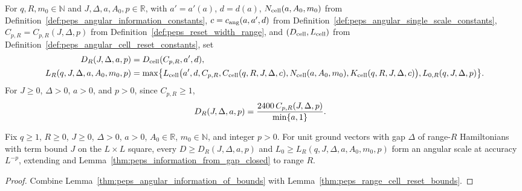\begin{definition}
    \label{def:peps_angular_constants_range}
    \leanok
    For $q,R,m_0\in\mathbb N$ and $J,\Delta,a,A_0,p\in\mathbb R$, with $a'=a'(a)$, $d=d(a)$, $N_{\rm cell}(a,A_0,m_0)$ from Definition~\ref{def:peps_angular_information_constants}, $c=c_{\rm ang}(a,a',d)$ from Definition~\ref{def:peps_angular_single_scale_constants}, $C_{p,R}=C_{p,R}(J,\Delta,p)$ from Definition~\ref{def:peps_reset_width_range}, and $(D_{\rm cell},L_{\rm cell})$ from Definition~\ref{def:peps_angular_cell_reset_constants}, set
    \begin{align}
        D_R(J,\Delta,a,p)           & =D_{\rm cell}(C_{p,R},a',d), \notag         \\
        L_R(q,J,\Delta,a,A_0,m_0,p) & =\max\bigl\{L_{\rm cell}\bigl(a',d,C_{p,R},
        C_{\rm cell}(q,R,J,\Delta,c),N_{\rm cell}(a,A_0,m_0),
        K_{\rm cell}(q,R,J,\Delta,c)\bigr),L_{0,R}(q,J,\Delta,p)\bigr\}.
        \label{eq:peps_angular_constants_range}
    \end{align}
    For $J\ge0$, $\Delta>0$, $a>0$, and $p>0$, since $C_{p,R}\ge1$,
    \begin{align}
        D_R(J,\Delta,a,p) & =\frac{2400\,C_{p,R}(J,\Delta,p)}{\min\{a,1\}}.
        \notag
    \end{align}
\end{definition}

\begin{lemma}
    \label{thm:peps_angular_information_range_closed}
    \leanok
    Fix $q\ge1$, $R\ge0$, $J\ge0$, $\Delta>0$, $a>0$, $A_0\in\mathbb R$, $m_0\in\mathbb N$, and integer $p>0$. For unit ground vectors with gap $\Delta$ of range-$R$ Hamiltonians with term bound $J$ on the $L\times L$ square, every $D\ge D_R(J,\Delta,a,p)$ and $L_0\ge L_R(q,J,\Delta,a,A_0,m_0,p)$ form an angular scale at accuracy $L^{-p}$, extending \cite[Proposition~3.4]{OpenAI2026PolynomialPEPS} and Lemma~\ref{thm:peps_information_from_gap_closed} to range $R$.
\end{lemma}
\begin{proof}
    \leanok
    Combine Lemma~\ref{thm:peps_angular_information_of_bounds} with Lemma~\ref{thm:peps_range_cell_reset_bounds}.
\end{proof}
